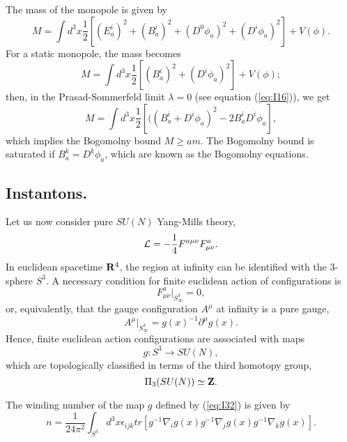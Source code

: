The mass of the monopole is given by 
\begin{equation}
M = \int d^3 x \frac {1}{2}  [ (E_a^{i})^2+ (B_a^{i})^2+ (D^0
\phi_a)^2+(D^{i} \phi_a)^2] + V(\phi).
\end{equation}
For a static monopole, the mass becomes
\begin{equation}
M = \int d^3 x \frac {1}{2}  [ (B_a^{i})^2+(D^{i} \phi_a)^2] +
V(\phi);
\end{equation}
then, in the Prasad-Sommerfeld \cite{PS} limit $\lambda=0$ (see equation
(\ref{eq:I16})), we get
\begin{equation}
M = \int d^3 x \frac {1}{2}  [ ((B_a^{i} + D^{i} \phi_a)^2 -2
B_a^{i} D^{i} \phi_a],
\end{equation}
which implies the Bogomolny \cite{B} bound $M \geq a m$. The Bogomolny bound
is saturated if $B_a^k = D^k \phi_a$, which are known as the
Bogomolny equations.


\subsection{Instantons.}
  
Let us now consider pure $SU(N)$ Yang-Mills theory,
\begin{equation}
{\cal L} = - \frac {1}{4} F^{a \mu \nu} F^{a}_{\mu \nu}.
\label{eq:I29}
\end{equation}
In euclidean spacetime ${\bf R}^4$, the region at infinity can be
identified with the $3$-sphere $S^3$. A necessary condition for
finite euclidean action of configurations is 
\begin{equation}
F^{a}_{\mu \nu} |_{S^3_{\infty}} = 0,
\label{eq:I30}
\end{equation}
or, equivalently, that the gauge configuration $A^{\mu}$ at
infinity is a pure gauge,
\begin{equation}
A^{\mu} |_{S_{\infty}^3} = g(x)^{-1} \partial ^{\mu} g(x).
\label{eq:I31}
\end{equation}
Hence, finite euclidean action configurations are associated with
maps 
\begin{equation}
g: S^3 \rightarrow SU(N),
\label{eq:I32}
\end{equation}
which are topologically classified in terms of the third
homotopy group,
\begin{equation}
\Pi_3(SU(N)) \simeq {\bf Z}.
\label{eq:I33}
\end{equation}
  
The winding number of the map $g$ defined by (\ref{eq:I32}) is
given by
\begin{equation}
n = \frac {1}{24 \pi^2} \int_{S^3} d^3 x \epsilon_{ijk} 
tr [ g^{-1} \nabla_i g(x) g^{-1} \nabla_j g(x) g^{-1} \nabla_k g(x) ].
\label{eq:I34}
\end{equation}
  
